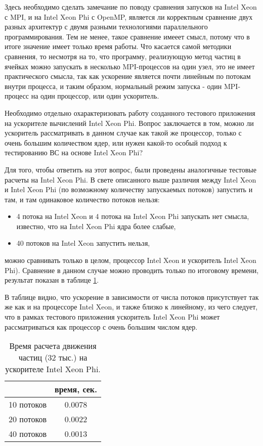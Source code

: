 Здесь необходимо сделать замечание по поводу сравнения запусков на Intel  Xeon с MPI, и на Intel Xeon Phi с OpenMP, является ли корректным сравнение двух разных архитектур с двумя разными технологиями параллельного программирования. Тем не менее, такое сравнение имееет смысл, потому что в итоге значение имеет только время работы. Что касается самой методики сравнения, то несмотря на то, что программу, реализующую метод частиц в ячейках можно запускать в несколько MPI-процессов на один узел, это не имеет практического смысла, так как ускорение является почти линейным по потокам внутри процесса, и таким образом, нормальный режим запуска - один MPI-процесс на один процессор, или один ускоритель.


Необходимо отдельно охарактеризовать работу созданного тестового приложения на ускорителе вычислений Intel Xeon Phi. Вопрос заключается в том, можно ли ускоритель рассматривать в данном случае как такой же процессор, только с очень большим количеством ядер, или нужен какой-то особый подход к тестированию ВС на основе Intel Xeon Phi?

Для того, чтобы ответить на этот вопрос, были проведены аналогичные тестовые расчеты на Intel Xeon Phi. 
В свете описанного выше различия между Intel Xeon и Intel Xeon Phi (по возможному количеству запускаемых потоков) запустить и там, и там одинаковое количество потоков нельзя:
\begin{itemize}
\item 4 потока на Intel Xeon и 4 потока на Intel Xeon Phi запускать нет смысла, известно, что на Intel Xeon Phi ядра более слабые,
\item  40 потоков на Intel Xeon запустить нельзя, 
\end{itemize}
можно сравнивать только в целом, процессор Intel Xeon и ускоритель Intel Xeon Phi). Сравнение в данном случае можно проводить только по итоговому времени, результат показан в таблице \ref{tab-ompXeonPhi}. 

В таблице видно, что ускорение в зависимости от числа потоков присутствует так же как и на процессоре Intel Xeon, и также близко к линейному, из чего следует, что в рамках тестового приложения ускоритель Intel Xeon Phi может рассматриваться как процессор с очень большим числом ядер.

\begin{center}
\begin{table} [htbp]
\caption{Время расчета движения частиц (32 тыс.) на ускорителе Intel Xeon Phi.}
\label{tabXeonPhi}%
\begin{tabular}{| c | c |}
\hline
		            & время, сек.  \\ \hline
		10 потоков  & 0.0078    \\ \hline
		20 потоков  & 0.0022      \\ \hline
		40 потоков  & 0.0013        \\ \hline
\end{tabular}
\label{tab-ompXeonPhi}
\end{table}
\end{center}


